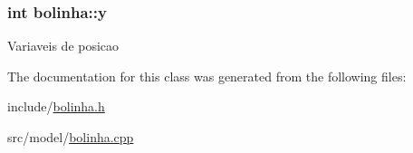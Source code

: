 \subsubsection[{\texorpdfstring{y}{y}}]{\setlength{\rightskip}{0pt plus 5cm}int bolinha\+::y\hspace{0.3cm}{\ttfamily [private]}}\hypertarget{classbolinha_a1ef5bc9948639dc0065e17a8e6b88846}{}\label{classbolinha_a1ef5bc9948639dc0065e17a8e6b88846}
Variaveis de posicao 

The documentation for this class was generated from the following files\+:\begin{DoxyCompactItemize}
\item 
include/\hyperlink{bolinha_8h}{bolinha.\+h}\item 
src/model/\hyperlink{bolinha_8cpp}{bolinha.\+cpp}\end{DoxyCompactItemize}
